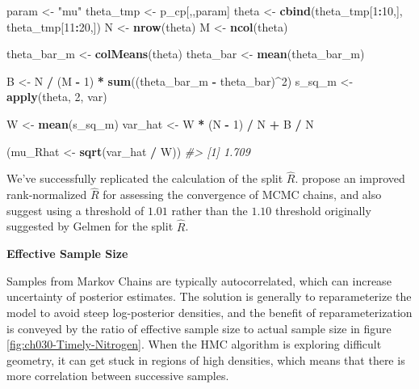 \documentclass[11pt, oneside, openany]{scrbook}
\newenvironment{Shaded}{\begin{snugshade}}{\end{snugshade}}
\newcommand{\CommentTok}[1]{\textcolor[rgb]{0.56,0.35,0.01}{\textit{#1}}}
\newcommand{\DecValTok}[1]{\textcolor[rgb]{0.00,0.00,0.81}{#1}}
\newcommand{\KeywordTok}[1]{\textcolor[rgb]{0.13,0.29,0.53}{\textbf{#1}}}
\newcommand{\NormalTok}[1]{#1}
\newcommand{\OperatorTok}[1]{\textcolor[rgb]{0.81,0.36,0.00}{\textbf{#1}}}
\newcommand{\StringTok}[1]{\textcolor[rgb]{0.31,0.60,0.02}{#1}}
\begin{document}
\begin{Shaded}
\begin{Highlighting}[]
\NormalTok{param <-}\StringTok{ "mu"}
\NormalTok{theta_tmp <-}\StringTok{ }\NormalTok{p_cp[,,param]}
\NormalTok{theta <-}\StringTok{ }\KeywordTok{cbind}\NormalTok{(theta_tmp[}\DecValTok{1}\OperatorTok{:}\DecValTok{10}\NormalTok{,], theta_tmp[}\DecValTok{11}\OperatorTok{:}\DecValTok{20}\NormalTok{,])}
\NormalTok{N     <-}\StringTok{ }\KeywordTok{nrow}\NormalTok{(theta)}
\NormalTok{M     <-}\StringTok{ }\KeywordTok{ncol}\NormalTok{(theta)}

\NormalTok{theta_bar_m <-}\StringTok{ }\KeywordTok{colMeans}\NormalTok{(theta)}
\NormalTok{theta_bar   <-}\StringTok{ }\KeywordTok{mean}\NormalTok{(theta_bar_m)}

\NormalTok{B <-}\StringTok{ }\NormalTok{N }\OperatorTok{/}\StringTok{ }\NormalTok{(M }\OperatorTok{-}\StringTok{ }\DecValTok{1}\NormalTok{) }\OperatorTok{*}\StringTok{ }\KeywordTok{sum}\NormalTok{((theta_bar_m }\OperatorTok{-}\StringTok{ }\NormalTok{theta_bar)}\OperatorTok{^}\DecValTok{2}\NormalTok{)}
\NormalTok{s_sq_m <-}\StringTok{ }\KeywordTok{apply}\NormalTok{(theta, }\DecValTok{2}\NormalTok{, var)}

\NormalTok{W <-}\StringTok{ }\KeywordTok{mean}\NormalTok{(s_sq_m)}
\NormalTok{var_hat <-}\StringTok{ }\NormalTok{W }\OperatorTok{*}\StringTok{ }\NormalTok{(N }\OperatorTok{-}\StringTok{ }\DecValTok{1}\NormalTok{) }\OperatorTok{/}\StringTok{ }\NormalTok{N }\OperatorTok{+}\StringTok{ }\NormalTok{B }\OperatorTok{/}\StringTok{ }\NormalTok{N}

\NormalTok{(mu_Rhat <-}\StringTok{ }\KeywordTok{sqrt}\NormalTok{(var_hat }\OperatorTok{/}\StringTok{ }\NormalTok{W))}
\CommentTok{#> [1] 1.709}
\end{Highlighting}
\end{Shaded}

We've successfully replicated the calculation of the split \(\hat{R}\). \citet{vehtari2020rank} propose an improved rank-normalized \(\hat{R}\) for assessing the convergence of MCMC chains, and also suggest using a threshold of \(1.01\) rather than the \(1.10\) threshold originally suggested by Gelmen for the split \(\hat{R}\).

\textbf{Effective Sample Size}

Samples from Markov Chains are typically autocorrelated, which can increase uncertainty of posterior estimates. The solution is generally to reparameterize the model to avoid steep log-posterior densities, and the benefit of reparameterization is conveyed by the ratio of effective sample size to actual sample size in figure \ref{fig:ch030-Timely-Nitrogen}. When the HMC algorithm is exploring difficult geometry, it can get stuck in regions of high densities, which means that there is more correlation between successive samples.
\end{document}
